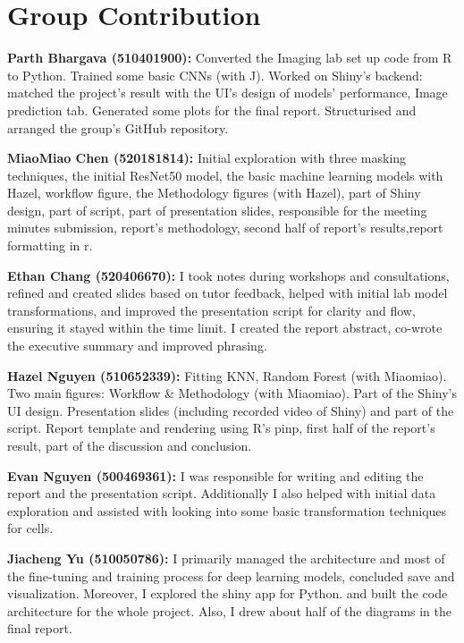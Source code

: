 \documentclass[letterpaper,9pt,twocolumn,twoside,]{pinp}
\begin{document}
\section*{Group Contribution}

\textbf{Parth Bhargava (510401900):} Converted the Imaging lab set up
code from R to Python. Trained some basic CNNs (with J). Worked on
Shiny's backend: matched the project's result with the UI's design of
models' performance, Image prediction tab. Generated some plots for the
final report. Structurised and arranged the group's GitHub repository.

\textbf{MiaoMiao Chen (520181814):} Initial exploration with three
masking techniques, the initial ResNet50 model, the basic machine
learning models with Hazel, workflow figure, the Methodology figures
(with Hazel), part of Shiny design, part of script, part of presentation
slides, responsible for the meeting minutes submission, report's
methodology, second half of report's results,report formatting in r.

\textbf{Ethan Chang (520406670):} I took notes during workshops and
consultations, refined and created slides based on tutor feedback,
helped with initial lab model transformations, and improved the
presentation script for clarity and flow, ensuring it stayed within the
time limit. I created the report abstract, co-wrote the executive
summary and improved phrasing.

\textbf{Hazel Nguyen (510652339):} Fitting KNN, Random Forest (with
Miaomiao). Two main figures: Workflow \& Methodology (with Miaomiao).
Part of the Shiny's UI design. Presentation slides (including recorded
video of Shiny) and part of the script. Report template and rendering
using R's pinp, first half of the report's result, part of the
discussion and conclusion.

\textbf{Evan Nguyen (500469361): }I was responsible for writing and
editing the report and the presentation script. Additionally I also
helped with initial data exploration and assisted with looking into some
basic transformation techniques for cells.

\textbf{Jiacheng Yu (510050786):} I primarily managed the architecture
and most of the fine-tuning and training process for deep learning
models, concluded save and visualization. Moreover, I explored the shiny
app for Python. and built the code architecture for the whole project.
Also, I drew about half of the diagrams in the final report.

\newpage
\end{document}
